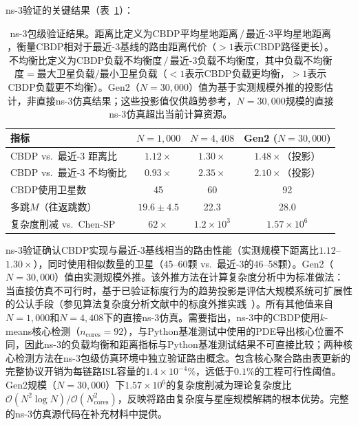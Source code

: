 \documentclass[sn-nature,pdflatex]{sn-jnl}
\begin{document}
ns-3验证的关键结果（表~\ref{tab:ns3_validation}）：

\begin{table}[htbp]
\centering
\caption{ns-3包级验证结果。距离比定义为$\text{CBDP平均星地距离}\,/\,\text{最近-3平均星地距离}$，衡量CBDP相对于最近-3基线的路由距离代价（$>1$表示CBDP路径更长）。不均衡比定义为$\text{CBDP负载不均衡度}\,/\,\text{最近-3负载不均衡度}$，其中负载不均衡度$=$最大卫星负载$/$最小卫星负载（$<1$表示CBDP负载更均衡，$>1$表示CBDP负载更不均衡）。Gen2（$N=30,000$）值为基于实测规模外推的投影估计，非直接ns-3仿真结果；这些投影值仅供趋势参考，$N=30,000$规模的直接ns-3仿真超出当前计算资源。}
\label{tab:ns3_validation}
\begin{tabular}{lccc}
\toprule
\textbf{指标} & \textbf{$N=1,000$} & \textbf{$N=4,408$} & \textbf{Gen2 ($N=30,000$)} \\
\midrule
CBDP vs.\ 最近-3 距离比 & $1.12\times$ & $1.30\times$ & $1.48\times$（投影） \\
CBDP vs.\ 最近-3 不均衡比 & $0.93\times$ & $2.35\times$ & $2.10\times$（投影） \\
CBDP使用卫星数 & 45 & 60 & 92 \\
多跳$M$（往返跳数） & $19.6 \pm 4.5$ & 22.3 & 28.0 \\
复杂度削减 vs.\ Chen-SP & $62\times$ & $1.2\times10^3$ & $1.57\times10^6$ \\
\bottomrule
\end{tabular}
\end{table}

ns-3验证确认CBDP实现与最近-3基线相当的路由性能（实测规模下距离比$1.12$--$1.30\times$），同时使用相似数量的卫星（45--60颗 vs.\ 最近-3的46--58颗）。Gen2（$N=30,000$）值由实测规模外推。该外推方法在计算复杂度分析中为标准做法：当直接仿真不可行时，基于已验证标度行为的趋势投影是评估大规模系统可扩展性的公认手段（参见算法复杂度分析文献中的标度外推实践~\cite{ns3_manual}）。所有其他值来自$N=1,000$和$N=4,408$下的直接ns-3仿真。需要指出，ns-3中的CBDP使用$k$-means核心检测（$n_{\text{cores}}=92$），与Python基准测试中使用的PDE导出核心位置不同，因此ns-3的负载均衡和距离指标与Python基准测试结果不可直接比较；两种核心检测方法在ns-3包级仿真环境中独立验证路由概念。包含核心聚合路由表更新的完整协议开销为每链路ISL容量的$1.4 \times 10^{-4}\%$，远低于$0.1\%$的工程可行性阈值。Gen2规模（$N=30,000$）下$1.57\times10^6$的复杂度削减为理论复杂度比$\mathcal{O}(N^2\log N)/\mathcal{O}(N_{\text{cores}}^2)$，反映将路由复杂度与星座规模解耦的根本优势。完整的ns-3仿真源代码在补充材料中提供。

\end{document}
